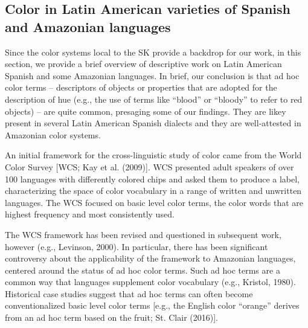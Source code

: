 \documentclass[
  english,
  ,apa7,floatsintext]{apa6}
\begin{document}
\hypertarget{color-in-latin-american-varieties-of-spanish-and-amazonian-languages}{%
\subsection{Color in Latin American varieties of Spanish and Amazonian languages}\label{color-in-latin-american-varieties-of-spanish-and-amazonian-languages}}

Since the color systems local to the SK provide a backdrop for our work, in this section, we provide a brief overview of descriptive work on Latin American Spanish and some Amazonian languages. In brief, our conclusion is that ad hoc color terms -- descriptors of objects or properties that are adopted for the description of hue (e.g., the use of terms like ``blood'' or ``bloody'' to refer to red objects) -- are quite common, presaging some of our findings. They are likey present in several Latin American Spanish dialects and they are well-attested in Amazonian color systems.

An initial framework for the cross-linguistic study of color came from the World Color Survey {[}WCS; Kay et al. (2009){]}. WCS presented adult speakers of over 100 languages with differently colored chips and asked them to produce a label, characterizing the space of color vocabulary in a range of written and unwritten languages. The WCS focused on basic level color terms, the color words that are highest frequency and most consistently used.

The WCS framework has been revised and questioned in subsequent work, however (e.g., Levinson, 2000). In particular, there has been significant controversy about the applicability of the framework to Amazonian languages, centered around the status of ad hoc color terms. Such ad hoc terms are a common way that languages supplement color vocabulary (e.g., Kristol, 1980). Historical case studies suggest that ad hoc terms can often become conventionalized basic level color terms {[}e.g., the English color ``orange'' derives from an ad hoc term based on the fruit; St. Clair (2016){]}.
\end{document}
